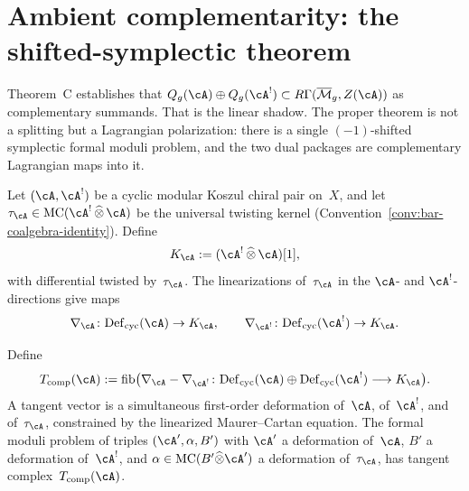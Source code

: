 
\section{Ambient complementarity: the shifted-symplectic theorem}
\label{sec:ambient-complementarity}

Theorem~C establishes that $Q_g(\cA) \oplus Q_g(\cA^!)
\subset R\Gamma(\overline{\mathcal{M}}_g, Z(\cA))$ as
complementary summands.  That is the linear shadow.  The
proper theorem is not a splitting but a Lagrangian
polarization: there is a single $(-1)$-shifted symplectic
formal moduli problem, and the two dual packages are
complementary Lagrangian maps into it.

\begin{definition}
\label{def:kernel-deformation-complex}
Let $(\cA, \cA^!)$ be a cyclic modular Koszul chiral pair
on~$X$, and let
$\tau_\cA \in \mathrm{MC}(\cA^! \,\widehat{\otimes}\, \cA)$
be the universal twisting kernel
(Convention~\ref{conv:bar-coalgebra-identity}).  Define
\[
K_\cA := (\cA^! \,\widehat{\otimes}\, \cA)[1],
\]
with differential twisted by~$\tau_\cA$.  The linearizations
of~$\tau_\cA$ in the $\cA$- and $\cA^!$-directions give maps
\[
\nabla_\cA \colon \mathrm{Def}_{\mathrm{cyc}}(\cA)
\to K_\cA,
\qquad
\nabla_{\cA^!} \colon \mathrm{Def}_{\mathrm{cyc}}(\cA^!)
\to K_\cA.
\]
\end{definition}

\begin{definition}
\label{def:ambient-tangent-complex}
Define
\begin{equation}\label{eq:ambient-tangent}
T_{\mathrm{comp}}(\cA)
:= \mathrm{fib}\bigl(
  \nabla_\cA - \nabla_{\cA^!} \colon
  \mathrm{Def}_{\mathrm{cyc}}(\cA) \oplus
  \mathrm{Def}_{\mathrm{cyc}}(\cA^!)
  \longrightarrow K_\cA
\bigr).
\end{equation}
A tangent vector is a simultaneous first-order deformation
of~$\cA$, of~$\cA^!$, and of~$\tau_\cA$, constrained by the
linearized Maurer--Cartan equation.  The formal moduli problem
of triples $(\cA', \alpha, B')$ with $\cA'$ a deformation
of~$\cA$, $B'$ a deformation of~$\cA^!$, and
$\alpha \in \mathrm{MC}(B' \widehat{\otimes} \cA')$ a
deformation of~$\tau_\cA$, has tangent
complex~$T_{\mathrm{comp}}(\cA)$.
\end{definition}

